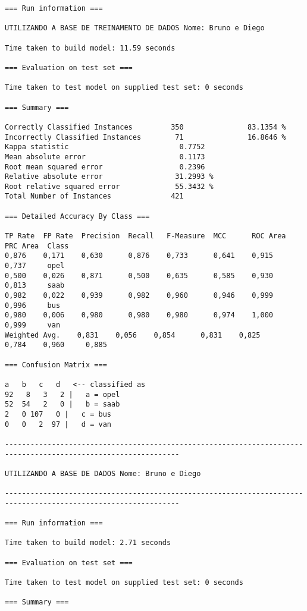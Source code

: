 \documentclass[
	article,			%
	11pt,				%
	oneside,			%
	a4paper,			%
	english,			%
	brazil,				%
	sumario=tradicional
	]{abntex2}
\begin{document}
\begin{lstlisting}
=== Run information ===

UTILIZANDO A BASE DE TREINAMENTO DE DADOS Nome: Bruno e Diego

Time taken to build model: 11.59 seconds

=== Evaluation on test set ===

Time taken to test model on supplied test set: 0 seconds

=== Summary ===

Correctly Classified Instances         350               83.1354 %
Incorrectly Classified Instances        71               16.8646 %
Kappa statistic                          0.7752
Mean absolute error                      0.1173
Root mean squared error                  0.2396
Relative absolute error                 31.2993 %
Root relative squared error             55.3432 %
Total Number of Instances              421     

=== Detailed Accuracy By Class ===

TP Rate  FP Rate  Precision  Recall   F-Measure  MCC      ROC Area  PRC Area  Class
0,876    0,171    0,630      0,876    0,733      0,641    0,915     0,737     opel
0,500    0,026    0,871      0,500    0,635      0,585    0,930     0,813     saab
0,982    0,022    0,939      0,982    0,960      0,946    0,999     0,996     bus
0,980    0,006    0,980      0,980    0,980      0,974    1,000     0,999     van
Weighted Avg.    0,831    0,056    0,854      0,831    0,825      0,784    0,960     0,885     

=== Confusion Matrix ===

a   b   c   d   <-- classified as
92   8   3   2 |   a = opel
52  54   2   0 |   b = saab
2   0 107   0 |   c = bus
0   0   2  97 |   d = van

---------------------------------------------------------------------------------------------------------------

UTILIZANDO A BASE DE DADOS Nome: Bruno e Diego

---------------------------------------------------------------------------------------------------------------

=== Run information ===

Time taken to build model: 2.71 seconds

=== Evaluation on test set ===

Time taken to test model on supplied test set: 0 seconds

=== Summary ===


\end{lstlisting}
\end{document}
